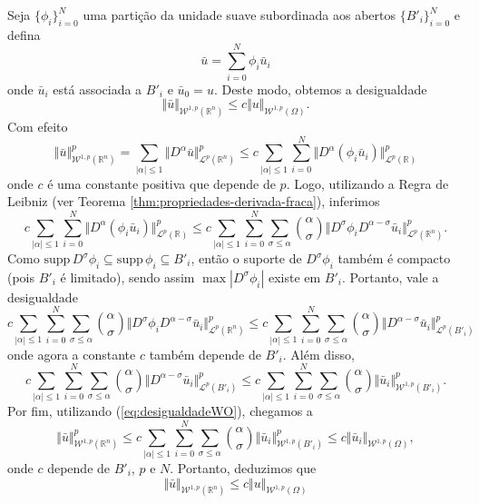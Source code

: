 \documentclass[a4paper, 11pt]{book}
\theoremstyle{definition}
\newcommand{\bR}{\mathbb{R}}
\newcommand{\cL}{\mathcal{L}}
\newcommand{\cW}{\mathcal{W}}
\newcommand{\supp}{\mathrm{supp}\,}
\begin{document}
\begin{prf}
    Seja $\{\phi_i\}_{i=0}^N$ uma partição da unidade suave subordinada aos abertos $\{B'_i\}_{i=0}^N$ e defina
    \[
        \bar u = \sum_{i=0}^N \phi_i \bar u_i
    \]
    onde $\bar u_i$ está associada a $B'_i$ e $\bar u_0 = u$. Deste modo, obtemos a desigualdade
    \[
        \Vert \bar u \Vert_{\cW^{1,p}(\bR^n)} \leqslant c \Vert u \Vert_{\cW^{1,p}(\Omega)}.
    \]
    Com efeito
    \[
        \Vert \bar u \Vert^p_{\cW^{1,p}(\bR^n)} = \sum_{|\alpha| \leqslant 1} \Vert D^\alpha \bar u \Vert^p_{\cL^p(\bR^n)}
        \leqslant c\sum_{|\alpha| \leqslant 1} \sum_{i=0}^N \Vert D^\alpha (\phi_i \bar u_i) \Vert_{\cL^p(\bR)}^p
    \]
    onde $c$ é uma constante positiva que depende de $p$. Logo, utilizando a Regra de Leibniz (ver Teorema \ref{thm:propriedades-derivada-fraca}), inferimos
    \[
        c\sum_{|\alpha| \leqslant 1} \sum_{i=0}^N \Vert D^\alpha (\phi_i \bar u_i) \Vert_{\cL^p(\bR)}^p \leqslant c\sum_{|\alpha| \leqslant 1} \sum_{i=0}^{N} \sum_{\sigma \leqslant \alpha} \binom{\alpha}{\sigma} \Vert D^\sigma \phi_i D^{\alpha - \sigma} \bar u_i \Vert_{\cL^p(\bR^n)}^p.
    \]
    Como $\supp D^\sigma \phi_i \subseteq \supp \phi_i \subseteq B'_i$, então o suporte de $D^\sigma \phi_i$ também é compacto (pois $B'_i$ é limitado), sendo assim $\max |D^\sigma \phi_i|$ existe em $B'_i$.
    Portanto, vale a desigualdade
    \[
        c\sum_{|\alpha| \leqslant 1} \sum_{i=0}^{N} \sum_{\sigma \leqslant \alpha} \binom{\alpha}{\sigma} \Vert D^\sigma \phi_i D^{\alpha - \sigma} \bar u_i \Vert_{\cL^p(\bR^n)}^p \leqslant c\sum_{|\alpha| \leqslant 1} \sum_{i=0}^{N} \sum_{\sigma \leqslant \alpha} \binom{\alpha}{\sigma} \Vert D^{\alpha - \sigma} \bar u_i \Vert_{\cL^p(B'_i)}^p
    \]
    onde agora a constante $c$ também depende de $B'_i$. Além disso,
    \[
        c\sum_{|\alpha| \leqslant 1} \sum_{i=0}^{N} \sum_{\sigma \leqslant \alpha} \binom{\alpha}{\sigma} \Vert D^{\alpha - \sigma} \bar u_i \Vert_{\cL^p(B'_i)}^p \leqslant c\sum_{|\alpha| \leqslant 1} \sum_{i=0}^{N} \sum_{\sigma \leqslant \alpha} \binom{\alpha}{\sigma} \Vert \bar u_i \Vert_{\cW^{1,p}(B'_i)}^p.
    \]
    Por fim, utilizando (\ref{eq:desigualdadeWO}), chegamos a
    \[
         \Vert \bar u \Vert^p_{\cW^{1,p}(\bR^n)} \leqslant c\sum_{|\alpha| \leqslant 1} \sum_{i=0}^{N} \sum_{\sigma \leqslant \alpha} \binom{\alpha}{\sigma} \Vert \bar u_i \Vert_{\cW^{1,p}(B'_i)}^p \leqslant c\Vert \bar u_i \Vert_{\cW^{1,p}(\Omega)},
    \]
    onde $c$ depende de $B'_i$, $p$ e $N$.
    Portanto, deduzimos que
    \begin{equation} \label{eq:Mm}
        \Vert \bar u \Vert_{\cW^{1,p}(\bR^n)} \leqslant c \Vert u \Vert_{\cW^{1,p}(\Omega)}
    \end{equation}


\end{prf}
\end{document}
